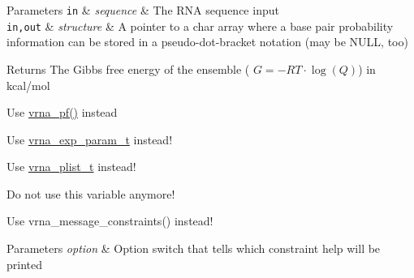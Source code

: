 \begin{DoxyRefList}
\begin{DoxyParams}[1]{Parameters}
\mbox{\tt in}  & {\em sequence} & The R\+N\+A sequence input \\
\hline
\mbox{\tt in,out}  & {\em structure} & A pointer to a char array where a base pair probability information can be stored in a pseudo-\/dot-\/bracket notation (may be N\+U\+L\+L, too) \\
\hline
\end{DoxyParams}
\begin{DoxyReturn}{Returns}
The Gibbs free energy of the ensemble ( $G = -RT \cdot \log(Q) $) in kcal/mol  
\end{DoxyReturn}

\item[\label{deprecated__deprecated000094}%
\hypertarget{deprecated__deprecated000094}{}%
Global \hyperlink{group__pf__fold_gac4f95bee734b2563a3d6e9932117ebdf}{pf\+\_\+fold\+\_\+par} (const char $\ast$sequence, char $\ast$structure, vrna\+\_\+exp\+\_\+param\+\_\+t $\ast$parameters, int calculate\+\_\+bppm, int is\+\_\+constrained, int is\+\_\+circular)]Use \hyperlink{group__pf__fold_ga29e256d688ad221b78d37f427e0e99bc}{vrna\+\_\+pf()} instead 
\item[\label{deprecated__deprecated000084}%
\hypertarget{deprecated__deprecated000084}{}%
Global \hyperlink{group__energy__parameters_ga8bffe1828e2cbec101769f5cc0b1535b}{pf\+\_\+param\+T} ]Use \hyperlink{group__energy__parameters_ga01d8b92fe734df8d79a6169482c7d8d8}{vrna\+\_\+exp\+\_\+param\+\_\+t} instead!  
\item[\label{deprecated__deprecated000043}%
\hypertarget{deprecated__deprecated000043}{}%
Global \hyperlink{group__data__structures_gab1d8894b43aa84cbc50b862a73785fbc}{plist} ]Use \hyperlink{group__data__structures_ga8e4eb5e1bfc95776559575beb359af87}{vrna\+\_\+plist\+\_\+t} instead!  
\item[\label{deprecated__deprecated000077}%
\hypertarget{deprecated__deprecated000077}{}%
Global \hyperlink{fold__vars_8h_ac98ec419070aee6831b44e5c700f090f}{pr} ]Do not use this variable anymore!  
\item[\label{deprecated__deprecated000039}%
\hypertarget{deprecated__deprecated000039}{}%
Global \hyperlink{constraints_8h_a4d167deb70bb51723e44374dc981deb2}{print\+\_\+tty\+\_\+constraint} (unsigned int option)]Use vrna\+\_\+message\+\_\+constraints() instead! 
\begin{DoxyParams}{Parameters}
{\em option} & Option switch that tells which constraint help will be printed  \\
\hline
\end{DoxyParams}


\end{DoxyRefList}
